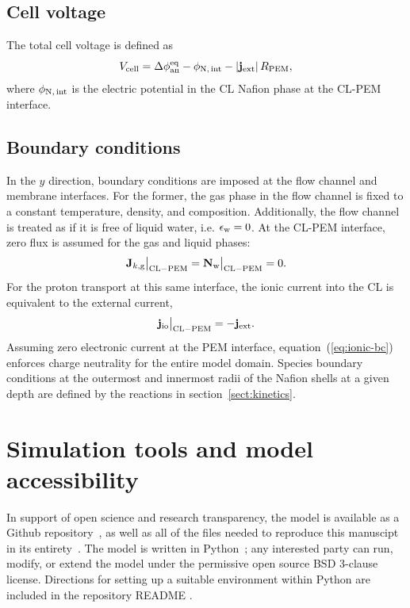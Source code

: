 \documentclass[final,3p,times,twocolumn]{elsarticle}    %
\begin{document}
\subsection{Cell voltage}

The total cell voltage is defined as
\begin{equation}
    V_{\rm cell} = \Delta \phi_{\rm an}^{\rm eq} - \phi_{\rm N,\, int} - \vert{\bf j}_{\rm ext}\rvert\, R_{\rm PEM},
\end{equation}
where $\phi_{\rm N,\, int}$ is the electric potential in the CL Nafion phase at the CL-PEM interface.

\subsection{Boundary conditions}

In the $y$ direction, boundary conditions are imposed at the flow channel and membrane interfaces. For the former, the gas phase in the flow channel is fixed to a constant temperature, density, and composition. Additionally, the flow channel is treated as if it is free of liquid water, i.e. $\epsilon_{\rm w} = 0$. At the CL-PEM interface, zero flux is assumed for the gas and liquid phases:
\begin{equation}
    {\bf J}_{k,\rm g} \big|_{\rm CL-PEM} = {\bf N}_{\rm w} \big|_{\rm CL-PEM} = 0.
\end{equation}
For the proton transport at this same interface, the ionic current into the CL is equivalent to the external current,
\begin{equation} \label{eq:ionic-bc}
    {\bf j}_{\rm io} \big|_{\rm CL-PEM} = -{\bf j}_{\rm ext}.
\end{equation}
Assuming zero electronic current at the PEM interface, equation~(\ref{eq:ionic-bc}) enforces charge neutrality for the entire model domain. Species boundary conditions at the outermost and innermost radii of the Nafion shells at a given depth are defined by the reactions in section~\ref{sect:kinetics}. 


\section{Simulation tools and model accessibility}
In support of open science and research transparency, the model is available as a Github repository~\cite{bib:randall_2021}, as well as all of the files needed to reproduce this manuscipt in its entirety~\cite{bib:pemfc_paper_2021}. The model is written in Python~\cite{bib:python_2022}; any interested party can run, modify, or extend the model under the permissive open source BSD 3-clause license. Directions for setting up a suitable environment within Python are included in the repository README .
\end{document}

